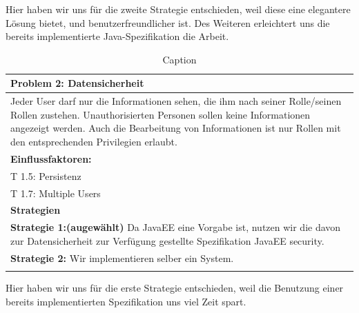 \documentclass[enabledeprecatedfontcommands,fontsize=12pt,paper=a4,twoside]{scrartcl}
\begin{document}
Hier haben wir uns für die zweite Strategie entschieden, weil diese eine elegantere Lösung bietet, und benutzerfreundlicher ist. Des Weiteren erleichtert uns die bereits implementierte Java-Spezifikation die Arbeit. \\

\begin{table}[]
    \centering
    \begin{tabular}{|p{15cm}|}
    \hline
          \textbf{Problem 2:} Datensicherheit \\ \hline
          Jeder User darf nur die Informationen sehen, die ihm nach seiner Rolle/seinen Rollen zustehen. Unauthorisierten Personen sollen keine Informationen angezeigt werden. Auch die Bearbeitung von Informationen ist nur Rollen mit den entsprechenden Privilegien erlaubt. \\ \hline
          \textbf{Einflussfaktoren: } \\
          T 1.5: Persistenz \\
          T 1.7: Multiple Users\\
          \hline
          \textbf{Strategien} \\ \hline
          \textbf{Strategie 1:(augewählt)} Da JavaEE eine Vorgabe ist, nutzen wir die davon zur Datensicherheit zur Verfügung gestellte Spezifikation JavaEE security.\\
          \textbf{Strategie 2:} Wir implementieren selber ein System. \\
          \\ \hline
    \end{tabular}

    \caption{Caption}
    \label{tab:my_label}
\end{table}
Hier haben wir uns für die erste Strategie entschieden, weil die Benutzung einer bereits implementierten Spezifikation uns viel Zeit spart. \\
\end{document}
